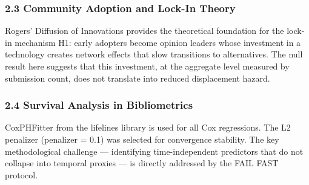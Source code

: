 \subsubsection{2.3 Community Adoption and Lock-In Theory}

Rogers' Diffusion of Innovations \cite{rogers2003diffusion} provides the theoretical foundation for the lock-in mechanism H1: early adopters become opinion leaders whose investment in a technology creates network effects that slow transitions to alternatives. The null result here suggests that this investment, at the aggregate level measured by submission count, does not translate into reduced displacement hazard.

\subsubsection{2.4 Survival Analysis in Bibliometrics}

CoxPHFitter from the lifelines library \cite{davidson2019lifelines} is used for all Cox regressions. The L2 penalizer (penalizer = 0.1) was selected for convergence stability. The key methodological challenge --- identifying time-independent predictors that do not collapse into temporal proxies --- is directly addressed by the FAIL FAST protocol.

